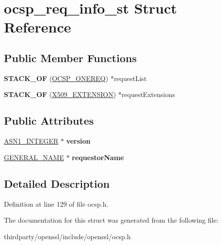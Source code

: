 \hypertarget{structocsp__req__info__st}{}\section{ocsp\+\_\+req\+\_\+info\+\_\+st Struct Reference}
\label{structocsp__req__info__st}
\subsection*{Public Member Functions}
\begin{DoxyCompactItemize}
\item 
\mbox{\label{structocsp__req__info__st_a426aa46bbaf15997a79cdcab9eda73b5}} 
{\bfseries S\+T\+A\+C\+K\+\_\+\+OF} (\hyperlink{structocsp__one__request__st}{O\+C\+S\+P\+\_\+\+O\+N\+E\+R\+EQ}) $\ast$request\+List
\item 
\mbox{\label{structocsp__req__info__st_acfed3cb49afe839e15256f27a4542897}} 
{\bfseries S\+T\+A\+C\+K\+\_\+\+OF} (\hyperlink{struct_x509__extension__st}{X509\+\_\+\+E\+X\+T\+E\+N\+S\+I\+ON}) $\ast$request\+Extensions
\end{DoxyCompactItemize}
\subsection*{Public Attributes}
\begin{DoxyCompactItemize}
\item 
\mbox{\label{structocsp__req__info__st_a945a047ebca6883967b717d6d39a5411}} 
\hyperlink{structasn1__string__st}{A\+S\+N1\+\_\+\+I\+N\+T\+E\+G\+ER} $\ast$ {\bfseries version}
\item 
\mbox{\label{structocsp__req__info__st_a6fd6c3850e1765a3e9a78b89c6d32f22}} 
\hyperlink{struct_g_e_n_e_r_a_l___n_a_m_e__st}{G\+E\+N\+E\+R\+A\+L\+\_\+\+N\+A\+ME} $\ast$ {\bfseries requestor\+Name}
\end{DoxyCompactItemize}


\subsection{Detailed Description}


Definition at line 129 of file ocsp.\+h.



The documentation for this struct was generated from the following file\+:\begin{DoxyCompactItemize}
\item 
thirdparty/openssl/include/openssl/ocsp.\+h\end{DoxyCompactItemize}
